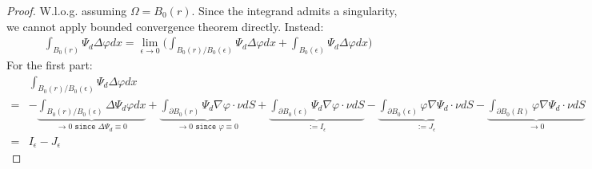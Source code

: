 \documentclass[a4paper,11pt,oneside,fleqn]{book}
\theoremstyle{definition}
\theoremstyle{remark}
\begin{document}
\begin{proof}
	W.l.o.g. assuming $\Omega = B_0(r)$. Since the integrand admits a singularity, we cannot apply bounded convergence theorem directly. Instead:
	\begin{align*}
		\int_{B_0(r)} \Psi_d \Delta \varphi dx = \lim_{\epsilon \rightarrow 0}\bigg(  \int_{B_0(r)\slash B_0(\epsilon)} \Psi_d \Delta \varphi dx + \int_{B_0(\epsilon)} \Psi_d \Delta \varphi dx\bigg)
	\end{align*}
	For the first part:
	\begin{align*}
		&\int_{B_0(r)\slash B_0(\epsilon) }  \Psi_d \Delta \varphi dx\\
		=& -  \underbrace{ \int_{B_0(r)\slash B_0(\epsilon)} \Delta \Psi_d \varphi dx}_{\rightarrow 0  \texttt{ since } \Delta \Psi_d \equiv 0}
		+ \underbrace{ \int_{\partial B_0(r)}  \Psi_d \nabla \varphi \cdot \nu dS}_{\rightarrow 0 \texttt{ since } \varphi \equiv 0}
		+ \underbrace{ \int_{\partial B_0(\epsilon)} \Psi_d \nabla \varphi \cdot \nu dS}_{:= I_\epsilon}
		- \underbrace{ \int_{\partial B_0(\epsilon)} \varphi \nabla \Psi_d \cdot \nu dS}_{:= J_\epsilon}
		- \underbrace{ \int_{\partial B_0(R)} \varphi \nabla \Psi_d \cdot \nu dS}_{\rightarrow 0}
		  \\
		 =& I_\epsilon - J_\epsilon
	\end{align*}


\end{proof}
\end{document}
